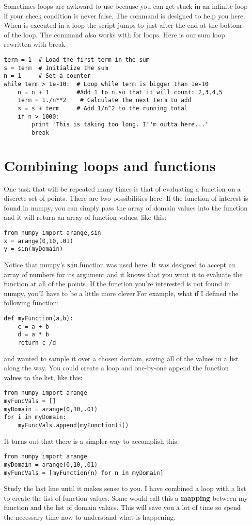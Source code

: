 Sometimes  loops are awkward to use because you can get
stuck in an infinite loop if your check condition is never false. The
 command is designed to help you here. When
 is executed in a loop the script jumps to just after
the end at the bottom of the loop. The  command also
works with for loops. Here is our sum loop rewritten with break
\begin{Verbatim}
term = 1  # Load the first term in the sum
s = term  # Initialize the sum
n = 1     # Set a counter
while term > 1e-10:  # Loop while term is bigger than 1e-10
    n = n + 1        #Add 1 to n so that it will count: 2,3,4,5
    term = 1./n**2    # Calculate the next term to add
    s = s + term     # Add 1/n^2 to the running total
    if n > 1000:
        print 'This is taking too long. I''m outta here...'
        break
\end{Verbatim} 

\section{Combining loops and functions}
One task that will be repeated many times is that of evaluating a
function on a discrete set of points.  There are two possibilities here. If
the function of interest is found in numpy, you can simply pass the
array of domain values into the function and it will return an array
of function values, like this:
\begin{Verbatim}
from numpy import arange,sin
x = arange(0,10,.01)
y = sin(myDomain)
\end{Verbatim}
Notice that numpy's \texttt{sin} function was used here.  It was
designed to accept an array of numbers for its argument and it knows
that you want it to evaluate the function at all of the points.  If
the function you're interested is not found in numpy, you'll have to
be a little more clever.For example, what if I defined
the following function:
\begin{Verbatim}
def myFunction(a,b):
    c = a + b
    d = a * b
    return c /d
\end{Verbatim}
and wanted to sample it over a chosen domain, saving all of the
values in a list along the way.  You could create a
loop and one-by-one append the function values to the list, like this:
\begin{Verbatim}
from numpy import arange
myFuncVals = []
myDomain = arange(0,10,.01)
for i in myDomain:
    myFuncVals.append(myFunction(i))
\end{Verbatim}
It turns
out that there is a simpler way to accomplish this:
\begin{Verbatim}
from numpy import arange
myDomain = arange(0,10,.01)
myFuncVals = [myFunction(n) for n in myDomain]
\end{Verbatim}
Study the last line until it makes sense to you.  I have combined a
loop with a list to create the list of function values.  Some would
call this a {\bf mapping} between my function and the list of domain
values.  This will save you a lot of time so spend the necessary time
now to understand what is happening.  
